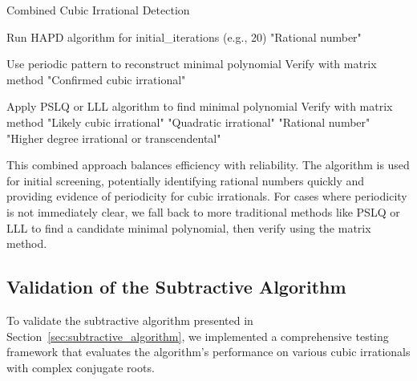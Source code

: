 \begin{algorithm}
\caption{Combined Cubic Irrational Detection}
\label{alg:combined_detection}
\begin{algorithmic}[1]
    \State Run HAPD algorithm for initial\_iterations (e.g., 20)
        \State \Return "Rational number"
    \EndIf
    
        \State Use periodic pattern to reconstruct minimal polynomial
        \State Verify with matrix method
        \State \Return "Confirmed cubic irrational"
    \EndIf
    
    \State Apply PSLQ or LLL algorithm to find minimal polynomial
        \State Verify with matrix method
        \State \Return "Likely cubic irrational"
        \State \Return "Quadratic irrational"
        \State \Return "Rational number"
    \Else
        \State \Return "Higher degree irrational or transcendental"
    \EndIf
\EndProcedure
\end{algorithmic}
\end{algorithm}

\begin{remark}
This combined approach balances efficiency with reliability. The \HAPD{} algorithm is used for initial screening, potentially identifying rational numbers quickly and providing evidence of periodicity for cubic irrationals. For cases where periodicity is not immediately clear, we fall back to more traditional methods like PSLQ or LLL to find a candidate minimal polynomial, then verify using the matrix method.
\end{remark}

\subsection{Validation of the Subtractive Algorithm}

To validate the subtractive algorithm presented in Section~\ref{sec:subtractive_algorithm}, we implemented a comprehensive testing framework that evaluates the algorithm's performance on various cubic irrationals with complex conjugate roots.

